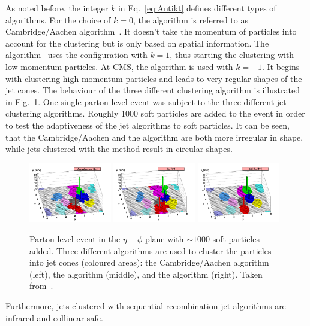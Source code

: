 As noted before, the integer $k$ in Eq.~\eqref{eq:Antikt} defines different types of algorithms.
For the choice of $k=0$, the algorithm is referred to as Cambridge/Aachen algorithm~\cite{bib:Cambridge_1997,bib:Cambridge_1998}.
It doesn't take the momentum of particles into account for the clustering but is only based on spatial information.
The \kt algorithm~\cite{bib:kT_algorithm_1993,bib:kT_algorithm_Ellis} uses the configuration with $k=1$, thus starting the clustering with low momentum particles.
At CMS, the \antikt algorithm is used with $k=-1$. 
It begins with clustering high momentum particles and leads to very regular shapes of the jet cones.
The behaviour of the three different clustering algorithm is illustrated in Fig.~\ref{fig:ClusteringAlgorithms}. 
One single parton-level event was subject to the three different jet clustering algorithms.
Roughly 1000 soft particles are added to the event in order to test the adaptiveness of the jet algorithms to soft particles.
It can be seen, that the Cambridge/Aachen and the \kt algorithm are both more irregular in shape, while jets clustered with the \antikt method result in circular shapes.
\begin{figure}[!t]
  \centering
      \includegraphics[width=0.32\textwidth]{figures/experiment/ObjectReconstruction/herwig-parton-level-ev-cam.pdf}
      \includegraphics[width=0.32\textwidth]{figures/experiment/ObjectReconstruction/herwig-parton-level-ev-kt.pdf}
      \includegraphics[width=0.32\textwidth]{figures/experiment/ObjectReconstruction/herwig-parton-level-ev-antikt.pdf}
  \caption{Parton-level event in the $\eta - \phi$ plane with $\sim 1000$ soft particles added. Three different algorithms are used to cluster the particles into jet cones (coloured areas): the Cambridge/Aachen algorithm (left), the \kt algorithm (middle), and the \antikt algorithm (right). Taken from~\cite{bib:JetClustering_2008}.}  
  \label{fig:ClusteringAlgorithms}
\end{figure}
Furthermore, jets clustered with sequential recombination jet algorithms are infrared and collinear safe.

